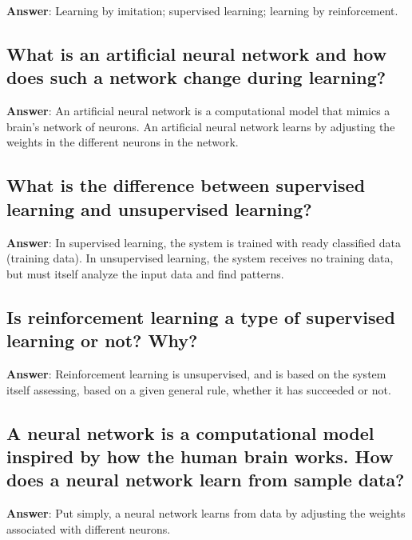 \documentclass[a4paper,11pt,oneside]{article}
\begin{document}
\begin{sloppypar}
\label{q:313:sa:en:True}

\textbf{Answer}: Learning by imitation; supervised learning; learning by reinforcement.



\subsection{What is an artificial neural network and how does such a network change during learning?}

\label{q:314:sa:en:True}

\textbf{Answer}: An artificial neural network is a computational model that mimics a brain's network of neurons. An artificial neural network learns by adjusting the weights in the different neurons in the network.



\subsection{What is the difference between supervised learning and unsupervised learning?}

\label{q:315:sa:en:True}

\textbf{Answer}: In supervised learning, the system is trained with ready classified data (training data). In unsupervised learning, the system receives no training data, but must itself analyze the input data and find patterns.



\subsection{Is reinforcement learning a type of supervised learning or not? Why?}

\label{q:316:sa:en:True}

\textbf{Answer}: Reinforcement learning is unsupervised, and is based on the system itself assessing, based on a given general rule, whether it has succeeded or not.



\subsection{A neural network is a computational model inspired by how the human brain works. How does a neural network learn from sample data?}

\label{q:317:sa:en:True}

\textbf{Answer}: Put simply, a neural network learns from data by adjusting the weights associated with different neurons.




\end{sloppypar}
\end{document}
